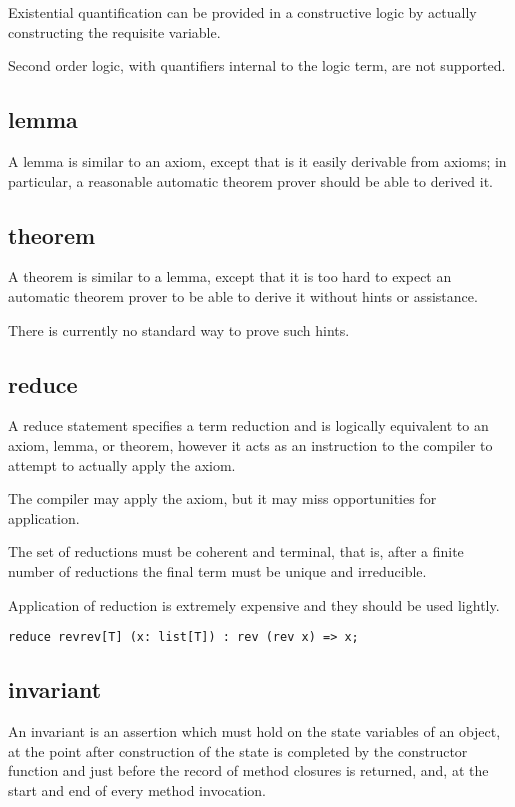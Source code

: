 \documentclass[oneside]{book}
\begin{document}
{Existential quantification can be provided in a constructive
logic by actually constructing the requisite variable.

Second order logic, with quantifiers internal to the 
logic term, are not supported.

\subsection{lemma}
A lemma is similar to an axiom, except that is it
easily derivable from axioms; in particular,
a reasonable automatic theorem prover should
be able to derived it.

\subsection{theorem}
A theorem is similar to a lemma, except that it is 
too hard to expect an automatic theorem prover
to be able to derive it without hints or assistance.

There is currently no standard way to prove such hints.

\subsection{reduce}
A reduce statement specifies a term reduction and is logically
equivalent to an axiom, lemma, or theorem, however it acts
as an instruction to the compiler to attempt to actually 
apply the axiom.

The compiler may apply the axiom, but it may miss opportunities
for application.

The set of reductions must be coherent and terminal, 
that is, after a finite number of reductions the final
term must be unique and irreducible. 

Application of reduction is extremely expensive and they
should be used lightly.

\begin{verbatim}
reduce revrev[T] (x: list[T]) : rev (rev x) => x;
\end{verbatim}



\subsection{invariant}
An invariant is an assertion which must hold on the state variables
of an object, at the point after construction of the state
is completed by the constructor function and just before the
record of method closures is returned, and, at the start and
end of every method invocation.

}
\end{document}
